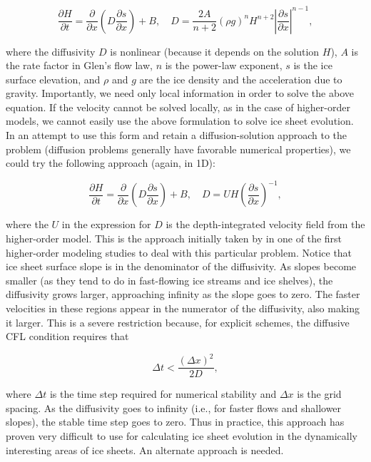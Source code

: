 \begin{equation}
\frac{\partial H}{\partial t}=\frac{\partial }{\partial x}\left( D\frac{\partial s}{\partial x} \right)+B,\quad D=\frac{2A}{n+2}\left( \rho g \right)^{n}H^{n+2}\left| \frac{\partial s}{\partial x} \right|^{n-1},
\end{equation}

\noindent
where the diffusivity $D$ is nonlinear (because it depends on the solution $H$), $A$ is the rate factor in Glen's flow law, $n$ is the power-law exponent, $s$ is the ice surface elevation, and $\rho$ and $g$ are the ice density and the acceleration due to gravity. Importantly, we need only local information in order to solve the above equation. If the velocity cannot be solved locally, as in the case of higher-order models, we cannot easily use the above formulation to solve ice sheet evolution. In an attempt to use this form and retain a diffusion-solution approach to the problem (diffusion problems generally have favorable numerical properties), we could try the following approach (again, in 1D):

\begin{equation}
\frac{\partial H}{\partial t}=\frac{\partial }{\partial x}\left( D\frac{\partial s}{\partial x} \right)+B,\quad D=UH\left( \frac{\partial s}{\partial x} \right)^{-1},
\end{equation}

\noindent
where the $U$ in the expression for $D$ is the depth-integrated velocity field from the higher-order model. This is the approach initially taken by \citet{Pattyn:2003tj} in one of the first higher-order modeling studies to deal with this particular problem. Notice that ice sheet surface slope is in the denominator of the diffusivity. As slopes become smaller (as they tend to do in fast-flowing ice streams and ice shelves), the diffusivity grows larger, approaching infinity as the slope goes to zero. The faster velocities in these regions appear in the numerator of the diffusivity, also making it larger. This is a severe restriction because, for explicit schemes, the diffusive CFL condition requires that

\begin{equation}
\Delta t<\frac{\left( \Delta x \right)^{2}}{2D},
\end{equation}

\noindent
where $\Delta t$ is the time step required for numerical stability and $\Delta x$ is the grid spacing. As the diffusivity goes to infinity (i.e., for faster flows and shallower slopes), the stable time step goes to zero. Thus in practice, this approach has proven very difficult to use for calculating ice sheet evolution in the dynamically interesting areas of ice sheets. An alternate approach is needed.

